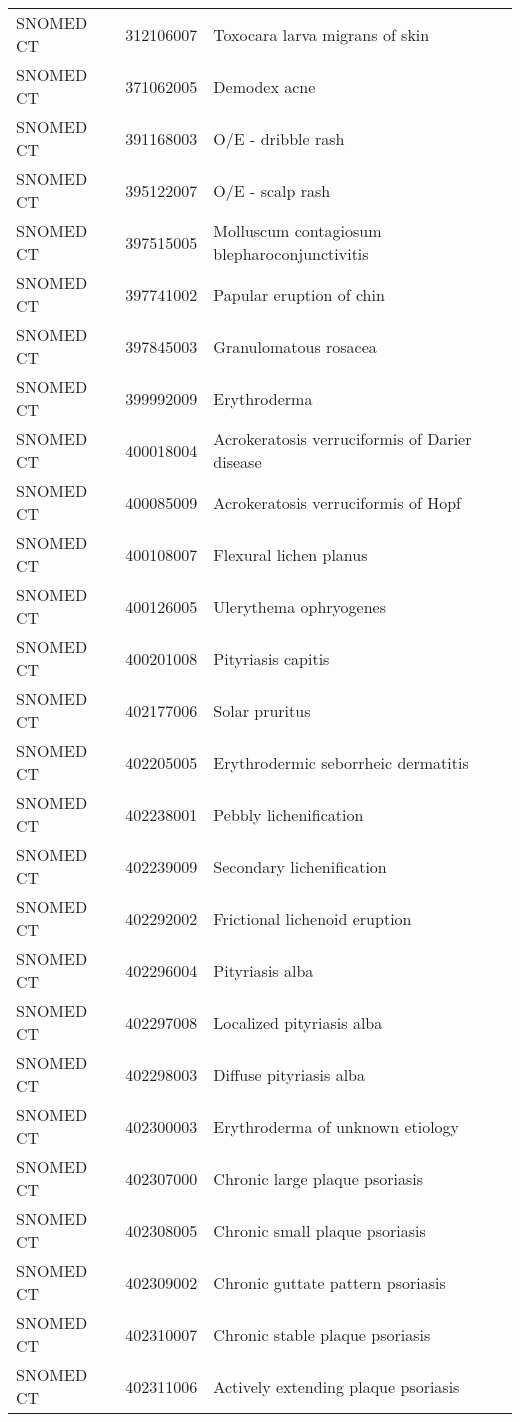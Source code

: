 \begin{longtable}{p{}p{}p{}}
  SNOMED CT & 312106007 & Toxocara larva migrans of skin \\ 
  SNOMED CT & 371062005 & Demodex acne \\ 
  SNOMED CT & 391168003 & O/E - dribble rash \\ 
  SNOMED CT & 395122007 & O/E - scalp rash \\ 
  SNOMED CT & 397515005 & Molluscum contagiosum blepharoconjunctivitis \\ 
  SNOMED CT & 397741002 & Papular eruption of chin \\ 
  SNOMED CT & 397845003 & Granulomatous rosacea \\ 
  SNOMED CT & 399992009 & Erythroderma \\ 
  SNOMED CT & 400018004 & Acrokeratosis verruciformis of Darier disease \\ 
  SNOMED CT & 400085009 & Acrokeratosis verruciformis of Hopf \\ 
  SNOMED CT & 400108007 & Flexural lichen planus \\ 
  SNOMED CT & 400126005 & Ulerythema ophryogenes \\ 
  SNOMED CT & 400201008 & Pityriasis capitis \\ 
  SNOMED CT & 402177006 & Solar pruritus \\ 
  SNOMED CT & 402205005 & Erythrodermic seborrheic dermatitis \\ 
  SNOMED CT & 402238001 & Pebbly lichenification \\ 
  SNOMED CT & 402239009 & Secondary lichenification \\ 
  SNOMED CT & 402292002 & Frictional lichenoid eruption \\ 
  SNOMED CT & 402296004 & Pityriasis alba \\ 
  SNOMED CT & 402297008 & Localized pityriasis alba \\ 
  SNOMED CT & 402298003 & Diffuse pityriasis alba \\ 
  SNOMED CT & 402300003 & Erythroderma of unknown etiology \\ 
  SNOMED CT & 402307000 & Chronic large plaque psoriasis \\ 
  SNOMED CT & 402308005 & Chronic small plaque psoriasis \\ 
  SNOMED CT & 402309002 & Chronic guttate pattern psoriasis \\ 
  SNOMED CT & 402310007 & Chronic stable plaque psoriasis \\ 
  SNOMED CT & 402311006 & Actively extending plaque psoriasis \\ 

\end{longtable}
